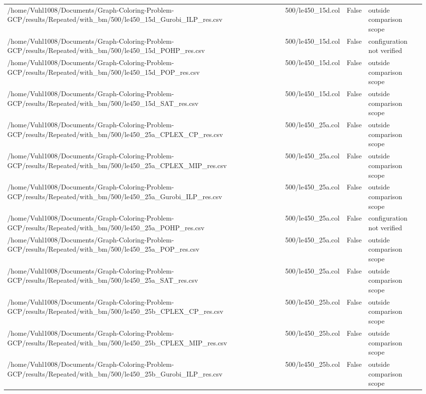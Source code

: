 \begin{table}[htbp]
\begin{tabular}{llll}
/home/Vuhl1008/Documents/Graph-Coloring-Problem-GCP/results/Repeated/with\_bm/500/le450\_15d\_Gurobi\_ILP\_res.csv & 500/le450\_15d.col & False & outside comparison scope \\
/home/Vuhl1008/Documents/Graph-Coloring-Problem-GCP/results/Repeated/with\_bm/500/le450\_15d\_POHP\_res.csv & 500/le450\_15d.col & False & configuration not verified \\
/home/Vuhl1008/Documents/Graph-Coloring-Problem-GCP/results/Repeated/with\_bm/500/le450\_15d\_POP\_res.csv & 500/le450\_15d.col & False & outside comparison scope \\
/home/Vuhl1008/Documents/Graph-Coloring-Problem-GCP/results/Repeated/with\_bm/500/le450\_15d\_SAT\_res.csv & 500/le450\_15d.col & False & outside comparison scope \\
/home/Vuhl1008/Documents/Graph-Coloring-Problem-GCP/results/Repeated/with\_bm/500/le450\_25a\_CPLEX\_CP\_res.csv & 500/le450\_25a.col & False & outside comparison scope \\
/home/Vuhl1008/Documents/Graph-Coloring-Problem-GCP/results/Repeated/with\_bm/500/le450\_25a\_CPLEX\_MIP\_res.csv & 500/le450\_25a.col & False & outside comparison scope \\
/home/Vuhl1008/Documents/Graph-Coloring-Problem-GCP/results/Repeated/with\_bm/500/le450\_25a\_Gurobi\_ILP\_res.csv & 500/le450\_25a.col & False & outside comparison scope \\
/home/Vuhl1008/Documents/Graph-Coloring-Problem-GCP/results/Repeated/with\_bm/500/le450\_25a\_POHP\_res.csv & 500/le450\_25a.col & False & configuration not verified \\
/home/Vuhl1008/Documents/Graph-Coloring-Problem-GCP/results/Repeated/with\_bm/500/le450\_25a\_POP\_res.csv & 500/le450\_25a.col & False & outside comparison scope \\
/home/Vuhl1008/Documents/Graph-Coloring-Problem-GCP/results/Repeated/with\_bm/500/le450\_25a\_SAT\_res.csv & 500/le450\_25a.col & False & outside comparison scope \\
/home/Vuhl1008/Documents/Graph-Coloring-Problem-GCP/results/Repeated/with\_bm/500/le450\_25b\_CPLEX\_CP\_res.csv & 500/le450\_25b.col & False & outside comparison scope \\
/home/Vuhl1008/Documents/Graph-Coloring-Problem-GCP/results/Repeated/with\_bm/500/le450\_25b\_CPLEX\_MIP\_res.csv & 500/le450\_25b.col & False & outside comparison scope \\
/home/Vuhl1008/Documents/Graph-Coloring-Problem-GCP/results/Repeated/with\_bm/500/le450\_25b\_Gurobi\_ILP\_res.csv & 500/le450\_25b.col & False & outside comparison scope \\

\end{tabular}
\end{table}
